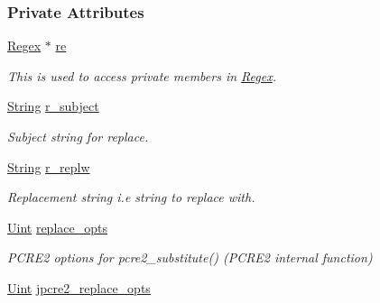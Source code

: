 \subsubsection*{Private Attributes}
\begin{DoxyCompactItemize}
\item 
\hyperlink{classjpcre2_1_1Regex}{Regex} $\ast$ \hyperlink{classjpcre2_1_1RegexReplace_ab8adfdb3aade18fe6bff03fb3262c396}{re}\hypertarget{classjpcre2_1_1RegexReplace_ab8adfdb3aade18fe6bff03fb3262c396}{}\label{classjpcre2_1_1RegexReplace_ab8adfdb3aade18fe6bff03fb3262c396}

\begin{DoxyCompactList}\small\item\em This is used to access private members in \hyperlink{classjpcre2_1_1Regex}{Regex}. \end{DoxyCompactList}\item 
\hyperlink{namespacejpcre2_a91f03070152fb228bc116c5a737f1d16}{String} \hyperlink{classjpcre2_1_1RegexReplace_a2290e5d9f1c2336abd431fef97e72c93}{r\+\_\+subject}\hypertarget{classjpcre2_1_1RegexReplace_a2290e5d9f1c2336abd431fef97e72c93}{}\label{classjpcre2_1_1RegexReplace_a2290e5d9f1c2336abd431fef97e72c93}

\begin{DoxyCompactList}\small\item\em Subject string for replace. \end{DoxyCompactList}\item 
\hyperlink{namespacejpcre2_a91f03070152fb228bc116c5a737f1d16}{String} \hyperlink{classjpcre2_1_1RegexReplace_a73d0da1aac8b83a0a47b24629b5013f4}{r\+\_\+replw}\hypertarget{classjpcre2_1_1RegexReplace_a73d0da1aac8b83a0a47b24629b5013f4}{}\label{classjpcre2_1_1RegexReplace_a73d0da1aac8b83a0a47b24629b5013f4}

\begin{DoxyCompactList}\small\item\em Replacement string i.\+e string to replace with. \end{DoxyCompactList}\item 
\hyperlink{namespacejpcre2_a078242d38221a13fb3543b9edd78c099}{Uint} \hyperlink{classjpcre2_1_1RegexReplace_afc79699cfcad8b7cbb26864b6b67cdc7}{replace\+\_\+opts}\hypertarget{classjpcre2_1_1RegexReplace_afc79699cfcad8b7cbb26864b6b67cdc7}{}\label{classjpcre2_1_1RegexReplace_afc79699cfcad8b7cbb26864b6b67cdc7}

\begin{DoxyCompactList}\small\item\em P\+C\+R\+E2 options for pcre2\+\_\+substitute() (P\+C\+R\+E2 internal function) \end{DoxyCompactList}\item 
\hyperlink{namespacejpcre2_a078242d38221a13fb3543b9edd78c099}{Uint} \hyperlink{classjpcre2_1_1RegexReplace_acf13bcb16918df4b7bcaa7e49a1c7d59}{jpcre2\+\_\+replace\+\_\+opts}\hypertarget{classjpcre2_1_1RegexReplace_acf13bcb16918df4b7bcaa7e49a1c7d59}{}\label{classjpcre2_1_1RegexReplace_acf13bcb16918df4b7bcaa7e49a1c7d59}


\end{DoxyCompactItemize}

